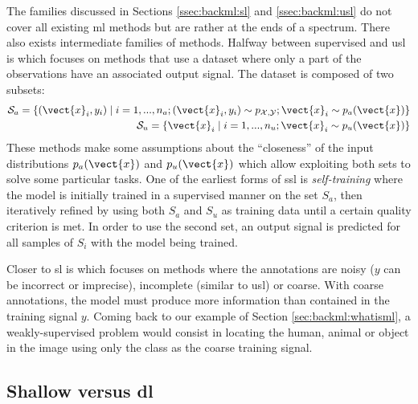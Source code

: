 The families discussed in Sections \ref{ssec:backml:sl} and \ref{ssec:backml:usl}
do not cover all existing \acrlong{ml} methods but are rather at the ends of a
spectrum. There also exists intermediate families of methods. Halfway between
supervised and \acrlong{usl} is  which focuses on methods that
use a dataset where only a part of the observations have an associated output
signal. The dataset is composed of two subsets:
\begin{eqnarray}
\mathcal{S}_a = \left\{(\vect{x}_i, y_i) \mid i = 1,...,n_a; (\vect{x}_i, y_i) \sim p_{\mathcal{X},\mathcal{Y}}; \vect{x}_i \sim p_a(\vect{x})\right\} \\
\mathcal{S}_u = \left\{\vect{x}_i \mid i = 1,...,n_u; \vect{x}_i \sim p_u(\vect{x})\right\}
\end{eqnarray}
These methods make some assumptions about the ``closeness'' of the input distributions
$p_a(\vect{x})$ and $p_u(\vect{x})$ \parencite{chapelle2006semi} which allow
exploiting both sets to solve some particular tasks. One of the earliest forms of
\acrlong{ssl} is \textit{self-training} \parencite{scudder1965probability} where
the model is initially trained in a supervised manner on the set $S_a$, then
iteratively refined by using both $S_a$ and $S_u$ as training data until a certain
quality criterion is met. In order to use the second set, an output signal is
predicted for all samples of $S_i$ with the model being trained.

Closer to \acrlong{sl} is  which focuses on methods where the
annotations are noisy (\eg $y$ can be incorrect or imprecise), incomplete (similar
to \acrlong{usl}) or coarse. With coarse annotations, the model must produce more
information than contained in the training signal $y$. Coming back to our example of Section
\ref{sec:backml:whatisml}, a weakly-supervised problem would consist in locating
the human, animal or object in the image using only the class as the coarse training
signal.

\subsection{Shallow versus \acrlong{dl}}
\label{ssec:backml:shallowdeep}

